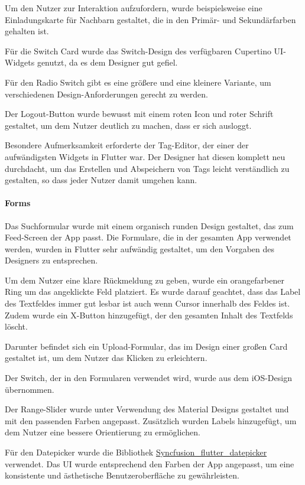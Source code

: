 Um den Nutzer zur Interaktion aufzufordern, wurde beispielsweise eine Einladungskarte für Nachbarn gestaltet, die in den Primär- und Sekundärfarben gehalten ist.

Für die Switch Card wurde das Switch-Design des verfügbaren Cupertino UI-Widgets genutzt, da es dem Designer gut gefiel.

Für den Radio Switch gibt es eine größere und eine kleinere Variante, um verschiedenen Design-Anforderungen gerecht zu werden.

Der Logout-Button wurde bewusst mit einem roten Icon und roter Schrift gestaltet, um dem Nutzer deutlich zu machen, dass er sich ausloggt.

Besondere Aufmerksamkeit erforderte der Tag-Editor, der einer der aufwändigsten Widgets in Flutter war. Der Designer hat diesen komplett neu durchdacht, um das Erstellen und Abspeichern von Tags leicht verständlich zu gestalten, so dass jeder Nutzer damit umgehen kann.

\paragraph{Forms}
Das Suchformular wurde mit einem organisch runden Design gestaltet, das zum Feed-Screen der App passt. Die Formulare, die in der gesamten App verwendet werden, wurden in Flutter sehr aufwändig gestaltet, um den Vorgaben des Designers zu entsprechen.

Um dem Nutzer eine klare Rückmeldung zu geben, wurde ein
orangefarbener Ring um das angeklickte Feld platziert. Es
wurde darauf geachtet, dass das Label des Textfeldes immer
gut lesbar ist auch wenn Cursor innerhalb des Feldes
ist. Zudem wurde ein X-Button hinzugefügt, der den gesamten
Inhalt des Textfelds löscht.

Darunter befindet sich ein Upload-Formular, das im Design einer großen Card gestaltet ist, um dem Nutzer das Klicken zu erleichtern.

Der Switch, der in den Formularen verwendet wird, wurde aus dem iOS-Design übernommen.

Der Range-Slider wurde unter Verwendung des Material Designs gestaltet und mit den passenden Farben angepasst. Zusätzlich wurden Labels hinzugefügt, um dem Nutzer eine bessere Orientierung zu ermöglichen.

Für den Datepicker wurde die Bibliothek
\href{https://pub.dev/packages/syncfusion_flutter_datepicker}{Syncfusion\_flutter\_datepicker}
verwendet. Das UI wurde entsprechend den Farben der App
angepasst, um eine konsistente und ästhetische
Benutzeroberfläche zu gewährleisten.

